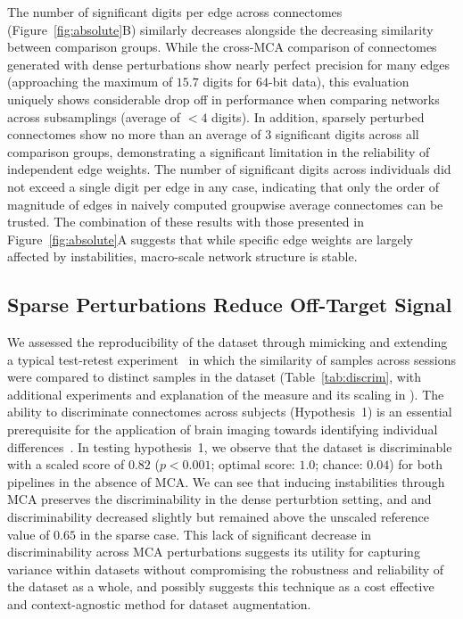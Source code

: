 \documentclass[10pt,letterpaper]{article}
\begin{document}
The number of significant digits per edge across connectomes
(Figure~\ref{fig:absolute}B) similarly decreases alongside the decreasing similarity
between comparison groups. While the cross-MCA comparison of connectomes generated
with dense perturbations show nearly perfect precision for many edges (approaching
the maximum of $15.7$ digits for $64$-bit data), this evaluation uniquely shows
considerable drop off in performance when comparing networks across subsamplings
(average of $< 4$ digits). In addition, sparsely perturbed connectomes show no more
than an average of $3$ significant digits across all comparison groups, demonstrating
a significant limitation in the reliability of independent edge weights. The number
of significant digits across individuals did not exceed a single digit per edge in
any case, indicating that only the order of magnitude of edges in naively computed
groupwise average connectomes can be trusted. The combination of these results with
those presented in Figure~\ref{fig:absolute}A suggests that while specific edge
weights are largely affected by instabilities, macro-scale network structure is stable.

\subsection*{Sparse Perturbations Reduce Off-Target Signal}

We assessed the reproducibility of the dataset through mimicking and extending a
typical test-retest experiment~\cite{bridgeford2020elim} in which the similarity of
samples across sessions were compared to distinct samples in the dataset
(Table~\ref{tab:discrim}, with additional experiments and explanation of the measure
and its scaling in ). The ability to discriminate
connectomes across subjects (Hypothesis~1) is an essential prerequisite for the
application of brain imaging towards identifying individual
differences~\cite{Dubois2016-yr}. In testing hypothesis~1, we observe that the
dataset is discriminable with a scaled score of $0.82$ ($p < 0.001$; optimal score:
$1.0$; chance: $0.04$) for both pipelines in the absence of MCA. We can see that
inducing instabilities through MCA preserves the discriminability in the dense
perturbtion setting, and and discriminability decreased slightly but remained above
the unscaled reference value of $0.65$ in the sparse case. This lack of significant
decrease in discriminability across MCA perturbations suggests its utility for
capturing variance within datasets without compromising the robustness and reliability 
of the dataset as a whole, and possibly suggests this technique as a cost effective
and context-agnostic method for dataset augmentation.
\end{document}
